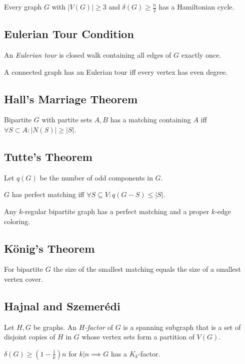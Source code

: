 Every graph $G$ with $|V(G)| \geq 3$ and $\delta(G) \geq \frac{n}{2}$ has a Hamiltonian cycle.

\subsection*{Eulerian Tour Condition}

An \emph{Eulerian tour} is closed walk containing all edges of $G$ exactly once.

\spacing

A connected graph has an Eulerian tour iff every vertex has even degree.

\subsection*{Hall's Marriage Theorem}

Bipartite $G$ with partite sets $A, B$ has a matching containing $A$ iff $\forall S \subset A : |N(S)|\geq|S|$.

\subsection*{Tutte's Theorem}

Let $q(G)$ be the number of odd components in $G$.

$G$ has perfect matching iff $\forall S \subseteq V : q(G-S) \leq |S|$.

\spacing

Any $k$-regular bipartite graph has a perfect matching and a proper $k$-edge coloring.

\subsection*{König's Theorem}

For bipartite $G$ the size of the smallest matching equals the size of a smallest vertex cover.

\subsection*{Hajnal and Szemer\'{e}di}

Let $H, G$ be graphs. An \emph{$H$-factor} of $G$ is a spanning subgraph that is a set of disjoint copies of $H$ in $G$ whose vertex sets form a partition of $V(G)$.

\spacing

$\delta(G) \geq (1-\frac{1}{k})n$ for $k | n \implies G$ has a $K_k$-factor.

